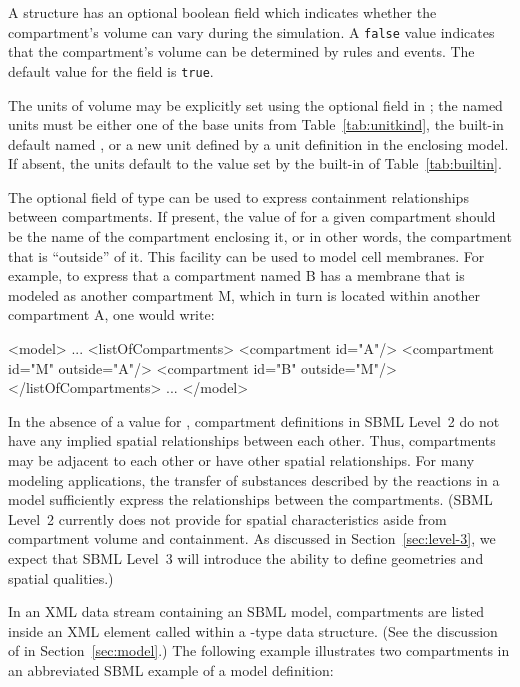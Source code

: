 \documentclass[10pt]{cekarticle}
\newcommand{\vref}[1]{\ref{#1}}
\begin{document}
A  structure has an optional 
boolean field which indicates whether the compartment's volume can
vary during the simulation.  A \texttt{false} value indicates that
the compartment's volume can be determined by rules and events.
The default value for the  field is
\texttt{true}.

The units of volume may be explicitly set using the optional field
 in ; the named units must be either one
of the base units from Table~\vref{tab:unitkind}, the built-in default
named , or a new unit defined by a unit definition in the
enclosing model.  If absent, the units default to the value set by the
built-in  of Table~\ref{tab:builtin}.

The optional field  of type  can be
used to express containment relationships between compartments. If
present, the value of  for a given compartment
should be the name of the compartment enclosing it, or in other
words, the compartment that is ``outside'' of it.  This facility
can be used to model cell membranes.  For example, to express that
a compartment named B has a membrane that is modeled as another
compartment M, which in turn is located within another compartment
A, one would write:
\begin{example}
<model>
    ...
    <listOfCompartments>
        <compartment id="A"/>
        <compartment id="M" outside="A"/>
        <compartment id="B" outside="M"/>
    </listOfCompartments>
    ...
</model>
\end{example}

In the absence of a value for , compartment
definitions in SBML Level~2 do not have any implied spatial
relationships between each other.  Thus, compartments may be
adjacent to each other or have other spatial relationships.  For
many modeling applications, the transfer of substances described
by the reactions in a model sufficiently express the relationships
between the compartments.  (SBML Level~2 currently does not
provide for spatial characteristics aside from compartment volume
and containment.  As discussed in Section~\ref{sec:level-3}, we
expect that SBML Level~3 will introduce the ability to define
geometries and spatial qualities.)

In an XML data stream containing an SBML model, compartments are listed
inside an XML element called  within a
-type data structure.  (See the discussion of  in
Section~\ref{sec:model}.)  The following example illustrates two
compartments in an abbreviated SBML example of a model definition:
\end{document}
